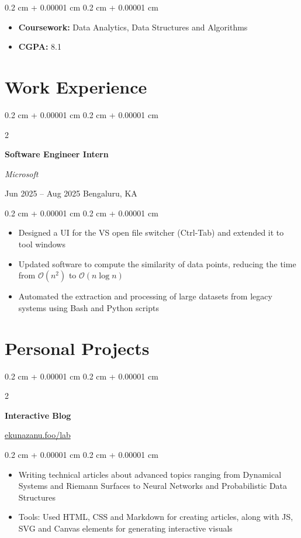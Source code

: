\documentclass[10pt, a4paper]{article}
\newenvironment{highlights}{
    \begin{itemize}[
        topsep=0.10 cm,
        parsep=0.10 cm,
        partopsep=0pt,
        itemsep=0pt,
        leftmargin=0.4 cm + 10pt
    ]
}{
    \end{itemize}
} %
\newenvironment{onecolentry}{
    \begin{adjustwidth}{
        0.2 cm + 0.00001 cm
    }{
        0.2 cm + 0.00001 cm
    }
}{
    \end{adjustwidth}
} %
\newenvironment{twocolentry}[2][]{
    \onecolentry
    \def\secondColumn{#2}
    \setcolumnwidth{\fill, 4.5 cm}
    \begin{paracol}{2}
}{
    \switchcolumn \raggedleft \secondColumn
    \end{paracol}
    \endonecolentry
} %
\begin{document}
        \vspace{0.10 cm}
        \begin{onecolentry}
            \begin{highlights}
                \item \textbf{Coursework:} Data Analytics, Data Structures and Algorithms
                \item \textbf{CGPA:} 8.1
            \end{highlights}
        \end{onecolentry}
    
    \section{Work Experience}        
        \begin{twocolentry}{
        Jun 2025 – Aug 2025
        Bengaluru, KA}
            \textbf{Software Engineer Intern}

            \textit{Microsoft}
        \end{twocolentry}

        \vspace{0.10 cm}
        \begin{onecolentry}
            \begin{highlights}
                \item Designed a UI for the VS open file switcher (Ctrl-Tab) and extended it to tool windows
                \item Updated software to compute the similarity of data points, reducing the time from $\mathcal{O}(n^2)$ to $\mathcal{O}(n \log n)$
                \item Automated the extraction and processing of large datasets from legacy systems using Bash and Python scripts
            \end{highlights}
        \end{onecolentry}
    
    \section{Personal Projects}

        \begin{twocolentry}{
        \href{https://ekunazanu.foo/lab}{ekunazanu.foo/lab}}
            \textbf{Interactive Blog}
        \end{twocolentry}
        \vspace{0.10 cm}
        \begin{onecolentry}
            \begin{highlights}
                \item Writing technical articles about advanced topics ranging from Dynamical Systems and Riemann Surfaces to Neural Networks and Probabilistic Data Structures
                \item Tools: Used HTML, CSS and Markdown for creating articles, along with JS, SVG and Canvas elements for generating interactive visuals
            \end{highlights}
        \end{onecolentry}
\end{document}
